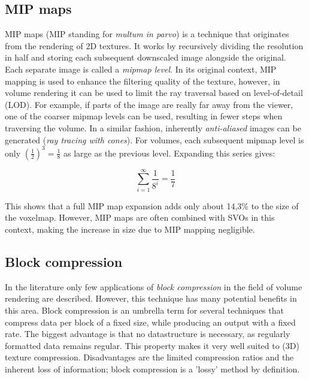 \subsection{MIP maps}
%
MIP maps (MIP standing for \emph{multum in parvo}) is a technique that originates from the rendering of 2D textures. It works by recursively dividing the resolution in half and storing each subsequent downscaled image alongside the original. Each separate image is called a \emph{mipmap level}. In its original context, MIP mapping is used to enhance the filtering quality of the texture, however, in volume rendering it can be used to limit the ray traversal based on level-of-detail (LOD). For example, if parts of the image are really far away from the viewer, one of the coarser mipmap levels can be used, resulting in fewer steps when traversing the volume. In a similar fashion, inherently \emph{anti-aliased} images can be generated (\emph{ray tracing with cones})\cite{amanatides84}. For volumes, each subsequent mipmap level is only $(\frac{1}{2})^3=\frac{1}{8}$ as large as the previous level. Expanding this series gives:

$$\sum_{i=1}^{\infty} \frac{1}{8^i} = \frac{1}{7}$$

This shows that a full MIP map expansion adds only about 14,3\% to the size of the voxelmap. However, MIP maps are often combined with SVOs in this context, making the increase in size due to MIP mapping negligible.
%
\subsection{Block compression}
%
In the literature only few applications of \emph{block compression} in the field of volume rendering are described. However, this technique has many potential benefits in this area. Block compression is an umbrella term for several techniques that compress data per block of a fixed size, while producing an output with a fixed rate. The biggest advantage is that no datastructure is necessary, as regularly formatted data remains regular. This property makes it very well suited to (3D) texture compression. Disadvantages are the limited compression ratios and the inherent loss of information; block compression is a 'lossy' method by definition.

